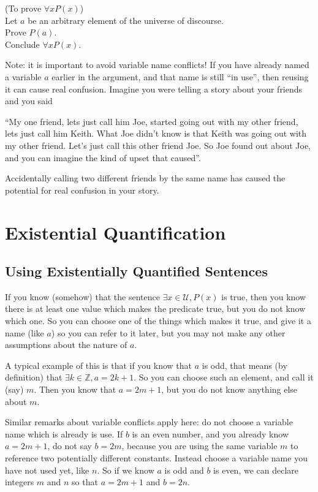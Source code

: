 \documentclass{article}
\begin{document}
\begin{fitch*}
	\textrm{(To prove $\forall x P(x)$)}\\
	\textrm{Let $a$ be an arbitrary element of the universe of discourse.}\\
	\textrm{Prove $P(a)$}.\\
	\textrm{Conclude $\forall x P(x)$.}
\end{fitch*}

Note:  it is important to avoid variable name conflicts!  If you have already named a variable $a$ earlier in the argument, and that name is still ``in use'', then reusing it can cause real confusion.  Imagine you were telling a story about your friends and you said

``My one friend, lets just call him Joe, started going out with my other friend, lets just call him Keith.  What Joe didn't know is that Keith was going out with my other friend.  Let's just call this other friend Joe.  So Joe found out about Joe, and you can imagine the kind of upset that caused''.

Accidentally calling two different friends by the same name has caused the potential for real confusion in your story.

\newpage

\section{Existential Quantification}

\subsection{Using Existentially Quantified Sentences}

If you know (somehow) that the sentence $\exists x \in \mathcal{U}, P(x)$ is true, then you know there is at least one value which makes the predicate true, but you do not know which one.  So you can choose one of the things which makes it true, and give it a name (like $a$) so you can refer to it later, but you may not make any other assumptions about the nature of $a$.

A typical example of this is that if you know that $a$ is odd, that means (by definition) that $\exists k \in \mathbb{Z}, a=2k+1$.  So you can choose such an element, and call it (say) $m$.  Then you know that $a=2m+1$, but you do not know anything else about $m$.  

Similar remarks about variable conflicts apply here:  do not choose a variable name which is already is use.  If $b$ is an even number, and you already know $a=2m+1$, do not say $b = 2m$, because you are using the same variable $m$ to reference two potentially different constants.  Instead choose a variable name you have not used yet, like $n$.  So if we know $a$ is odd and $b$ is even, we can declare integers $m$ and $n$ so that $a=2m+1$ and $b = 2n$.
\end{document}
